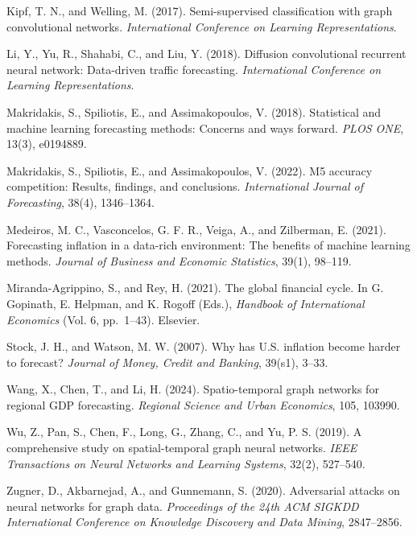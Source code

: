 \documentclass[
  11pt,
  a4paper]{article}
\begin{document}
Kipf, T. N., and Welling, M. (2017). Semi-supervised classification with
graph convolutional networks. \emph{International Conference on Learning
Representations}.

Li, Y., Yu, R., Shahabi, C., and Liu, Y. (2018). Diffusion convolutional
recurrent neural network: Data-driven traffic forecasting.
\emph{International Conference on Learning Representations}.

Makridakis, S., Spiliotis, E., and Assimakopoulos, V. (2018).
Statistical and machine learning forecasting methods: Concerns and ways
forward. \emph{PLOS ONE}, 13(3), e0194889.

Makridakis, S., Spiliotis, E., and Assimakopoulos, V. (2022). M5
accuracy competition: Results, findings, and conclusions.
\emph{International Journal of Forecasting}, 38(4), 1346--1364.

Medeiros, M. C., Vasconcelos, G. F. R., Veiga, A., and Zilberman, E.
(2021). Forecasting inflation in a data-rich environment: The benefits
of machine learning methods. \emph{Journal of Business and Economic
Statistics}, 39(1), 98--119.

Miranda-Agrippino, S., and Rey, H. (2021). The global financial cycle.
In G. Gopinath, E. Helpman, and K. Rogoff (Eds.), \emph{Handbook of
International Economics} (Vol. 6, pp.~1--43). Elsevier.

Stock, J. H., and Watson, M. W. (2007). Why has U.S. inflation become
harder to forecast? \emph{Journal of Money, Credit and Banking}, 39(s1),
3--33.

Wang, X., Chen, T., and Li, H. (2024). Spatio-temporal graph networks
for regional GDP forecasting. \emph{Regional Science and Urban
Economics}, 105, 103990.

Wu, Z., Pan, S., Chen, F., Long, G., Zhang, C., and Yu, P. S. (2019). A
comprehensive study on spatial-temporal graph neural networks.
\emph{IEEE Transactions on Neural Networks and Learning Systems}, 32(2),
527--540.

Zugner, D., Akbarnejad, A., and Gunnemann, S. (2020). Adversarial
attacks on neural networks for graph data. \emph{Proceedings of the 24th
ACM SIGKDD International Conference on Knowledge Discovery and Data
Mining}, 2847--2856.
\end{document}
